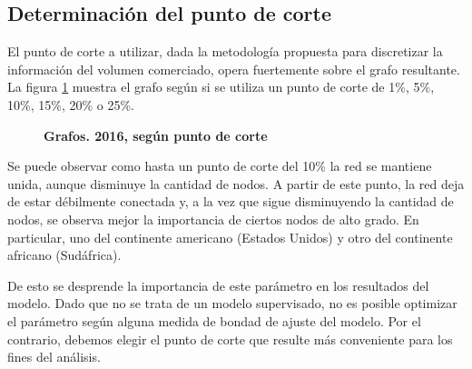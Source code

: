 \documentclass[class=article, crop=false]{standalone}
\begin{document}
\subsection{Determinación del punto de corte}

El punto de corte a utilizar, dada la metodología propuesta para discretizar la información del volumen comerciado, opera fuertemente sobre el grafo resultante. La figura \ref{fig:grafo_2016} muestra el grafo según si se utiliza un punto de corte de 1\%, 5\%, 10\%, 15\%, 20\% o 25\%.

\begin{figure}
	\centering
	\caption{\textbf{Grafos. 2016, según punto de corte}}
	\label{fig:grafo_2016}
\end{figure}

Se puede observar como hasta un punto de corte del 10\% la red se mantiene unida, aunque disminuye la cantidad de nodos. A partir de este punto, la red deja de estar débilmente conectada y, a la vez que sigue disminuyendo la cantidad de nodos, se observa mejor la importancia de ciertos nodos de alto grado. En particular, uno del continente americano (Estados Unidos) y otro del continente africano (Sudáfrica).


De esto se desprende la importancia de este parámetro en los resultados del modelo. Dado que no se trata de un modelo supervisado, no es posible optimizar el parámetro según alguna medida de bondad de ajuste del modelo. Por el contrario, debemos elegir el punto de corte que resulte más conveniente para los fines del análisis. 
\end{document}
